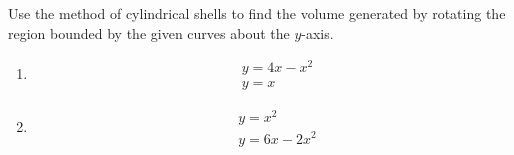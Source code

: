 \documentclass[letterpaper,11pt]{article}
\begin{document}

Use the method of cylindrical shells to find the volume generated by rotating the region bounded by the given curves about the $y$-axis.
\begin{enumerate}
    \item \begin{align*}
        & y = 4x - x^2 \\
        & y = x
    \end{align*}
\vfill
\newpage
$\ $
\newpage
    \item \begin{align*}
        & y = x^2 \\
        & y = 6x-2x^2
    \end{align*}
\end{enumerate}
\newpage
$\ $
\end{document}
